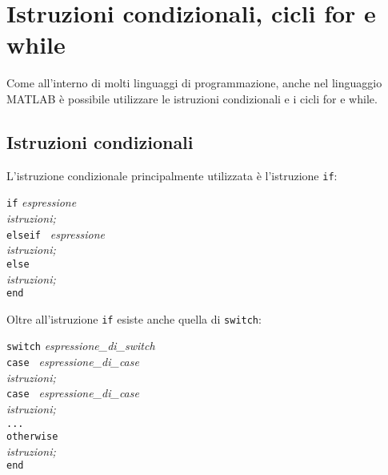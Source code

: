 \chapter{Istruzioni condizionali, cicli for e while}
Come all'interno di molti linguaggi di programmazione, anche nel linguaggio MATLAB è possibile utilizzare le istruzioni 
condizionali e i cicli for e while.

\section{Istruzioni condizionali}
L'istruzione condizionale principalmente utilizzata è l'istruzione \texttt{if}: \break

\begin{center}
\texttt{if} \textit{espressione} \\ 
\hspace{1.5cm}\textit{istruzioni;}  \\
\hspace{1cm}\texttt{elseif } \textit{espressione} \\ 
\hspace{1.4cm}\textit{istruzioni;}  \\
\hspace{-1.8cm}\texttt{else} \\ 
\hspace{1.4cm}\textit{istruzioni;}  \\
\hspace{-2cm}\texttt{end}
\end{center}

Oltre all'istruzione  \texttt{if} esiste anche quella di \texttt{switch}:

\begin{center}
\texttt{switch} \textit{espressione\_di\_switch} \\ 
\hspace{1cm}\texttt{case } \textit{espressione\_di\_case} \\ 
\hspace{1.4cm}\textit{istruzioni;}  \\
\hspace{1cm}\texttt{case } \textit{espressione\_di\_case} \\ 
\hspace{1.4cm}\textit{istruzioni;}  \\
\hspace{2cm} \texttt{...} \\
\hspace{-2cm}\texttt{otherwise } \\ 
\hspace{1.4cm}\textit{istruzioni;}  \\
\hspace{-5cm}\texttt{end}
\end{center}

